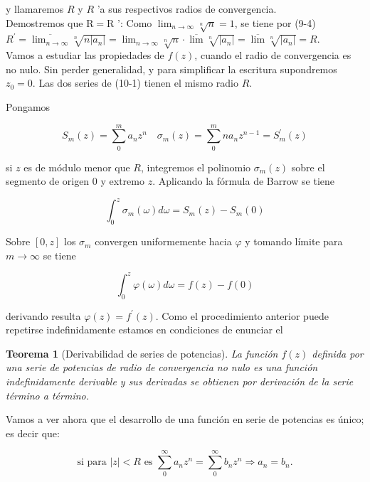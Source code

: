 \documentclass[10pt]{article}
\theoremstyle{plain}
\newtheorem{theorem}{Teorema}[section]
\theoremstyle{definition}
\theoremstyle{remark}
\begin{document}
y llamaremos $R$ y $R$ 'a sus respectivos radios de convergencia.\\
Demostremos que $\mathrm{R}=\mathrm{R}$ ': Como $\lim _{n \rightarrow \infty} \sqrt[n]{n}=1$, se tiene por (9-4)\\
$R^{\prime}=\overline{\lim _{n \rightarrow \infty}} \sqrt[n]{n\left|a_{n}\right|}=\lim _{n \rightarrow \infty} \sqrt[n]{n} \cdot \overline{\lim } \sqrt[n]{\left|a_{n}\right|}=\overline{\lim } \sqrt[n]{\left|a_{n}\right|}=R$.\\
Vamos a estudiar las propiedades de $f(z)$, cuando el radio de convergencia es no nulo. Sin perder generalidad, y para simplificar la escritura supondremos $z_{0}=0$. Las dos series de (10-1) tienen el mismo radio $R$.

Pongamos

$$
S_{m}(z)=\sum_{0}^{m} a_{n} z^{n} \quad \sigma_{m}(z)=\sum_{0}^{m} n a_{n} z^{n-1}=S_{m}^{\prime}(z)
$$

si $z$ es de módulo menor que $R$, integremos el polinomio $\sigma_{m}(z)$ sobre el segmento de origen 0 y extremo $z$. Aplicando la fórmula de Barrow se tiene

$$
\int_{0}^{z} \sigma_{m}(\omega) d \omega=S_{m}(z)-S_{m}(0)
$$

Sobre $[0, z]$ los $\sigma_{m}$ convergen uniformemente hacia $\varphi$ y tomando límite para $m \rightarrow \infty$ se tiene

$$
\int_{0}^{z} \varphi(\omega) d \omega=f(z)-f(0)
$$

derivando resulta $\varphi(z)=f^{\prime}(z)$. Como el procedimiento anterior puede repetirse indefinidamente estamos en condiciones de enunciar el

\begin{theorem}[Derivabilidad de series de potencias]
La función $f(z)$ definida por una serie de potencias de radio de convergencia no nulo es una función indefinidamente derivable y sus derivadas se obtienen por derivación de la serie término a término.
\end{theorem}

Vamos a ver ahora que el desarrollo de una función en serie de potencias es único; es decir que:

\begin{equation*}
\text{si para }|z|<R \text{ es } \sum_{0}^{\infty} a_{n} z^{n}=\sum_{0}^{\infty} b_{n} z^{n} \Rightarrow a_{n}=b_{n} . \tag{10-2}
\end{equation*}
\end{document}
